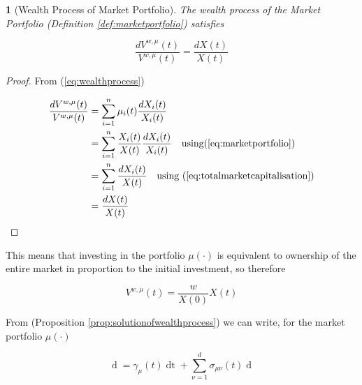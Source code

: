 \documentclass[british]{amsart}
\numberwithin{equation}{section}
\numberwithin{figure}{section}
\theoremstyle{plain}
\newtheorem{thm}{\protect\theoremname}[section]
\theoremstyle{definition}
\theoremstyle{plain}
\theoremstyle{plain}
\theoremstyle{plain}
\theoremstyle{remark}
\theoremstyle{plain}
\providecommand{\theoremname}{Theorem}
\renewcommand{\d}[1]{\mathop{\mathrm{d}{#1}}}
\begin{document}
\begin{thm} [Wealth Process of Market Portfolio]

  The wealth process of the Market Portfolio (Definition
\ref{def:marketportfolio}) satisfies

  \begin{equation} \label{eq:wealthprocessofmarketportfolio}
\frac{d{V^{w,\mu}(t)}}{V^{w,\mu}(t)} = \frac{d{X(t)}}{X(t)}  \end{equation}

\end{thm}

\begin{proof}

  From (\ref{eq:wealthprocess})

  \begin{gather} \begin{split} \frac{d{V^{w,\mu}(t)}}{V^{w,\mu}(t)} & =
\sum_{i=1}^{n} \mu_{i}(t) \frac{d{X_{i}(t)}}{X_{i}(t)} \\ & = \sum_{i=1}^{n}
\frac{X_{i}(t)}{X(t)} \frac{d{X_{i}(t)}}{X_{i}(t)} \quad \text{using}
(\ref{eq:marketportfolio}) \\ & = \sum_{i=1}^{n} \frac{d{X_{i}(t)}}{X(t)} \quad
\text{using } (\ref{eq:totalmarketcapitalisation}) \\ & = \frac{d{X(t)}}{X(t)}
\end{split} \end{gather}

\end{proof}

This means that investing in the portfolio $\mu(\cdot)$ is equivalent to
ownership of the entire market in proportion to the initial investment, so
therefore

\begin{equation} V^{w,\mu}(t) = \frac{w}{X(0)}X(t) \end{equation}

From (Proposition \ref{prop:solutionofwealthprocess}) we can write, for the
market portfolio $\mu(\cdot)$

\begin{equation} \d{V^{w,\mu}(t)} =  \gamma_{\mu}(t) \d{t} + \sum_{\nu=1}^{d}
\sigma_{\mu\nu}(t) \d{W_{\nu}(t)} \end{equation}
\end{document}
